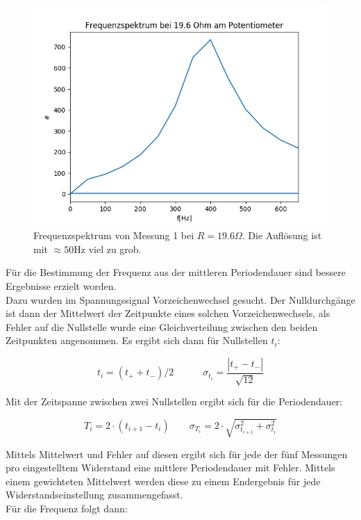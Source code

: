 \documentclass[12pt,a4paper]{article}
\begin{document}
\begin{figure}
\begin{center}
\includegraphics[scale=0.75]{Bilder/fft_19,6Ohm}
\end{center}
\caption{Frequenzspektrum von Messung 1 bei $R=19.6 \Omega$. Die Auflösung ist mit $\approx 50$Hz viel zu grob.}
\label{fig:Fourier19,6}
\end{figure}

Für die Bestimmung der Frequenz aus der mittleren Periodendauer sind bessere Ergebnisse erzielt worden.\\
Dazu wurden im Spannungssignal Vorzeichenwechsel gesucht. Der Nulldurchgänge ist dann der Mittelwert der Zeitpunkte eines solchen Vorzeichenwechsels, als Fehler auf die Nullstelle wurde eine Gleichverteilung zwischen den beiden Zeitpunkten angenommen. Es ergibt sich dann für Nullstellen $t_i$:

\begin{equation}
t_i=(t_++t_-)/2 \quad \quad \quad
\sigma_{t_i}=\frac{|t_+-t_-|}{\sqrt{12}}
\end{equation}

Mit der Zeitspanne zwischen zwei Nullstellen ergibt sich für die Periodendauer:

\begin{equation}
T_i=2\cdot (t_{i+1}-t_i) \quad \quad
\sigma_{T_i}=2\cdot \sqrt{\sigma_{t_{i+1}}^2+\sigma_{t_i}^2}
\end{equation}

Mittels Mittelwert und Fehler auf diesen ergibt sich für jede der fünf Messungen pro eingestelltem Widerstand eine mittlere Periodendauer mit Fehler. Mittels einem gewichteten Mittelwert werden diese zu einem Endergebnis für jede Widerstandseinstellung zusammengefasst.\\
Für die Frequenz folgt dann:
\end{document}
